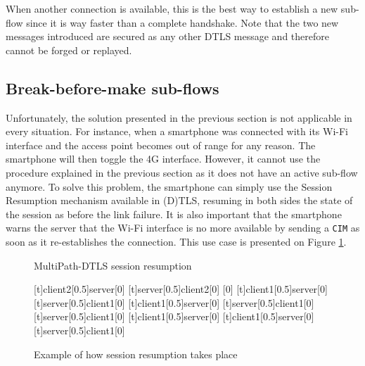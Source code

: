 When another connection is available, this is the best way to establish a new sub-flow since it is way faster than a complete handshake. Note that the two new messages introduced are secured as any other DTLS message and therefore cannot be forged or replayed.


\subsection{Break-before-make sub-flows\label{sec:breakbeforemake}}
Unfortunately, the solution presented in the previous section is not applicable in every situation. For instance, when a smartphone was connected with its Wi-Fi interface and the access point becomes out of range for any reason. The smartphone will then toggle the 4G interface. However, it cannot use the procedure explained in the previous section as it does not have an active sub-flow anymore. To solve this problem, the smartphone can simply use the Session Resumption mechanism available in (D)TLS, resuming in both sides the state of the session as before the link failure. It is also important that the smartphone warns the server that the Wi-Fi interface is no more available by sending a \texttt{CIM} as soon as it re-establishes the connection. This use case is presented on Figure \ref{fig:dtls-sessionresumption}.

\begin{figure}[!ht]
\centering
\begin{msc}[r]{MultiPath-DTLS session resumption}

\setlength{\instfootheight}{0em}
\setlength{\instheadheight}{0em}
\setlength{\instdist}{0.33\linewidth}
\setlength{\levelheight}{3em}


[t]{client2}[0.5]{server}[0]
\nextlevel
{}[t]{server}[0.5]{client2}[0]
\nextlevel
{}[0]
\nextlevel
{}
\nextlevel
{}
\nextlevel
{}[t]{client1}[0.5]{server}[0]
\nextlevel
{}[t]{server}[0.5]{client1}[0]
\nextlevel
{}[t]{client1}[0.5]{server}[0]
\nextlevel
{}[t]{server}[0.5]{client1}[0]
\nextlevel
{}[t]{server}[0.5]{client1}[0]
\nextlevel
{}[t]{client1}[0.5]{server}[0]
\nextlevel
{}[t]{client1}[0.5]{server}[0]
\nextlevel
{}[t]{server}[0.5]{client1}[0]
\nextlevel[2]

\end{msc}
\caption{Example of how session resumption takes place}
\label{fig:dtls-sessionresumption}
\end{figure}

